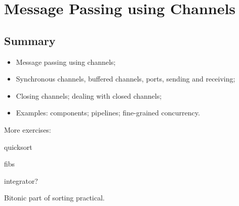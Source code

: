 \chapter{Message Passing using Channels} 






\section{Summary}

\begin{itemize}
\item 
Message passing using channels;

\item
Synchronous channels, buffered channels, ports, sending and receiving;

\item
Closing channels; dealing with closed channels;

\item
Examples: components; pipelines; fine-grained concurrency.
\end{itemize}



\exercises




 





More exercises:

quicksort

fibs

integrator?

Bitonic part of sorting practical.

